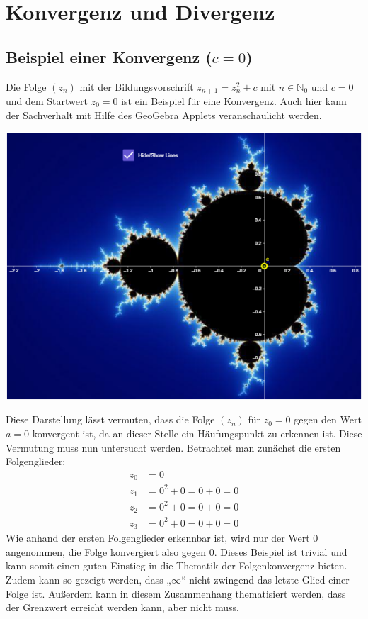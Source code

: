 \documentclass[a4paper, 12pt]{book}
\begin{document}
\sloppy
\frenchspacing

\chapter{Konvergenz und Divergenz}

\section{Beispiel einer Konvergenz ($c=0$)}

Die Folge \(\left( z_{n} \right)\) mit der Bildungsvorschrift
\(z_{n + 1} = z_{n}^{2} + c\) mit \(n \in \mathbb{N}_{0}\) und
\(c=0\) und dem Startwert \(z_{0} = 0\) ist ein Beispiel für
eine Konvergenz. Auch hier kann der Sachverhalt mit Hilfe des GeoGebra
Applets veranschaulicht werden.

\begin{center}
\includegraphics[width=0.5\linewidth]{image9.png}
\end{center}


Diese Darstellung lässt vermuten, dass die Folge
\(\left( z_{n} \right)\) für \(z_{0} = 0\) gegen den Wert
\(a = 0\) konvergent ist, da an dieser Stelle ein Häufungspunkt zu
erkennen ist. Diese Vermutung muss nun untersucht werden. Betrachtet man
zunächst die ersten Folgenglieder:
\begin{align*}
z_{0} &= 0 \\
z_{1} &= 0^{2} + 0 = 0 + 0 = 0\\
z_{2} &= 0^{2} + 0 = 0 + 0 = 0\\
z_{3} &= 0^{2} + 0 = 0 + 0 = 0
\end{align*}
Wie anhand der ersten Folgenglieder erkennbar ist, wird nur der Wert 0
angenommen, die Folge konvergiert also gegen 0. Dieses Beispiel ist
trivial und kann somit einen guten Einstieg in die Thematik der
Folgenkonvergenz bieten. Zudem kann so gezeigt werden, dass
„\(\infty\)`` nicht zwingend das letzte Glied einer Folge ist. Außerdem
kann in diesem Zusammenhang thematisiert werden, dass der Grenzwert
erreicht werden kann, aber nicht muss.
\end{document}
